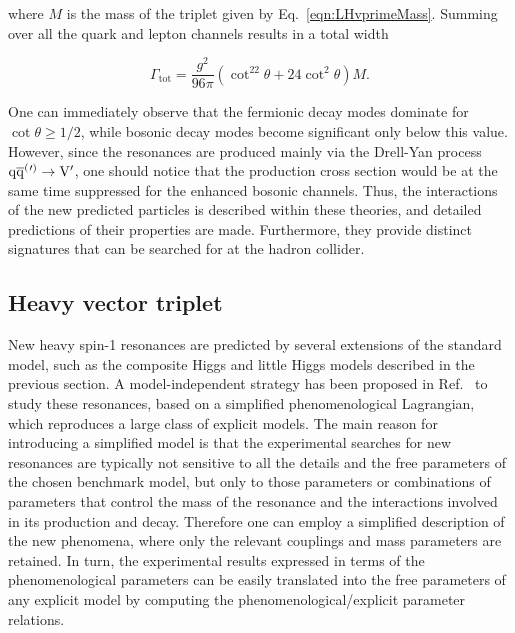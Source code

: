 \noindent where $M$ is the mass of the \PVpr triplet given by Eq.~\ref{eqn:LHvprimeMass}.
Summing over all the quark and lepton channels results in a total width

\begin{equation}\label{eqn:LHvprimeWidth}
\Gamma_\mathrm{tot} = \frac{g^2}{96\pi}(\cot^22\theta + 24\cot^2\theta)M.
\end{equation}

One can immediately observe that the fermionic decay modes dominate for $\cot\theta \geq 1/2$, while bosonic decay modes become significant only below this value.
However, since the \PVpr resonances are produced mainly via the Drell-Yan process $\mathrm{q}\overline{\mathrm{q}}^({}'^){} \to \mathrm{V}^\prime$, one should notice that the production cross section would be at the same time suppressed for the enhanced bosonic channels.
Thus, the interactions of the new predicted particles is described within these theories, and detailed predictions of their properties are made.
Furthermore, they provide distinct signatures that can be searched for at the hadron collider.

\subsection{Heavy vector triplet}\label{subsec:hvt}

New heavy spin-1 resonances are predicted by several extensions of the standard model, such as the composite Higgs and little Higgs models described in the previous section.
A model-independent strategy has been proposed in Ref.~\cite{Pappadopulo:2014qza} to study these resonances, based on a simplified phenomenological Lagrangian, which reproduces a large class of explicit models.
The main reason for introducing a simplified model is that the experimental searches for new resonances are typically not sensitive to all the details and the free parameters of the chosen benchmark model, but only to those parameters or combinations of parameters that control the mass of the resonance and the interactions involved in its production and decay. Therefore one can employ a simplified description of the new phenomena, where only the relevant couplings and mass parameters are retained. In turn, the experimental results expressed in terms of the phenomenological parameters can be easily translated into the free parameters of any explicit model by computing the phenomenological/explicit parameter relations.\\

